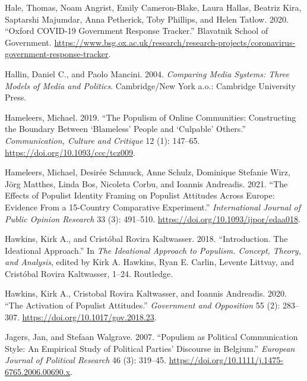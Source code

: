 \documentclass[
]{ccr}
\newlength{\cslhangindent}
\newlength{\cslentryspacingunit} %
\newenvironment{CSLReferences}[2] %
 {%
  \setlength{\parindent}{0pt}
  \ifodd #1
  \let\oldpar\par
  \def\par{\hangindent=\cslhangindent\oldpar}
  \fi
  \setlength{\parskip}{#2\cslentryspacingunit}
 }%
 {}
\begin{document}
\begin{CSLReferences}{1}{0}
\leavevmode{}%
Hale, Thomas, Noam Angrist, Emily Cameron-Blake, Laura Hallas, Beatriz
Kira, Saptarshi Majumdar, Anna Petherick, Toby Phillips, and Helen
Tatlow. 2020. {``Oxford {COVID-19} Government Response Tracker.''}
{Blavatnik School of Government}.
\url{https://www.bsg.ox.ac.uk/research/research-projects/coronavirus-government-response-tracker}.

\leavevmode{}%
Hallin, Daniel C., and Paolo Mancini. 2004. \emph{Comparing {Media
Systems}: {Three Models} of {Media} and {Politics}}. {Cambridge/New York
a.o.}: {Cambridge University Press}.

\leavevmode{}%
Hameleers, Michael. 2019. {``The Populism of Online Communities:
{Constructing} the Boundary Between {`Blameless'} People and
{`Culpable'} Others.''} \emph{Communication, Culture and Critique} 12
(1): 147--65. \url{https://doi.org/10.1093/ccc/tcz009}.

\leavevmode{}%
Hameleers, Michael, Desirée Schmuck, Anne Schulz, Dominique Stefanie
Wirz, Jörg Matthes, Linda Bos, Nicoleta Corbu, and Ioannis Andreadis.
2021. {``The {Effects} of {Populist Identity Framing} on {Populist
Attitudes Across Europe}: {Evidence From} a 15-{Country Comparative
Experiment}.''} \emph{International Journal of Public Opinion Research}
33 (3): 491--510. \url{https://doi.org/10.1093/ijpor/edaa018}.

\leavevmode{}%
Hawkins, Kirk A., and Cristóbal Rovira Kaltwasser. 2018.
{``Introduction. {The} Ideational Approach.''} In \emph{The {Ideational
Approach} to {Populism}. {Concept}, {Theory}, and {Analysis}}, edited by
Kirk A. Hawkins, Ryan E. Carlin, Levente Littvay, and Cristóbal Rovira
Kaltwasser, 1--24. {Routledge}.

\leavevmode{}%
Hawkins, Kirk A., Cristobal Rovira Kaltwasser, and Ioannis Andreadis.
2020. {``The {Activation} of {Populist Attitudes}.''} \emph{Government
and Opposition} 55 (2): 283--307.
\url{https://doi.org/10.1017/gov.2018.23}.

\leavevmode{}%
Jagers, Jan, and Stefaan Walgrave. 2007. {``Populism as Political
Communication Style: {An} Empirical Study of Political Parties'
Discourse in {Belgium}.''} \emph{European Journal of Political Research}
46 (3): 319--45. \url{https://doi.org/10.1111/j.1475-6765.2006.00690.x}.


\end{CSLReferences}
\end{document}
